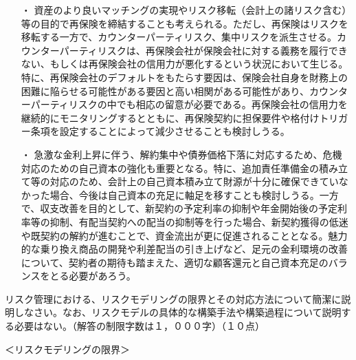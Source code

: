 \documentclass[report,gutter=10mm,fore-edge=10mm,uplatex,dvipdfmx]{jlreq}
\begin{document}
\begin{itemize}
 \item [・]  資産のより良いマッチングの実現やリスク移転（会計上の諸リスク含む）等の目的で再保険を締結することも考えられる。ただし、再保険はリスクを移転する一方で、カウンターパーティリスク、集中リスクを派生させる。カウンターパーティリスクは、再保険会社が保険会社に対する義務を履行できない、もしくは再保険会社の信用力が悪化するという状況において生じる。特に、再保険会社のデフォルトをもたらす要因は、保険会社自身を財務上の困難に陥らせる可能性がある要因と高い相関がある可能性があり、カウンターパーティリスクの中でも相応の留意が必要である。再保険会社の信用力を継続的にモニタリングするとともに、再保険契約に担保要件や格付けトリガー条項を設定することによって減少させることも検討しうる。
 \item [・]  急激な金利上昇に伴う、解約集中や債券価格下落に対応するため、危機対応のための自己資本の強化も重要となる。特に、追加責任準備金の積み立て等の対応のため、会計上の自己資本積み立て財源が十分に確保できていなかった場合、今後は自己資本の充足に軸足を移すことも検討しうる。一方で、収支改善を目的として、新契約の予定利率の抑制や年金開始後の予定利率等の抑制、有配当契約への配当の抑制等を行った場合、新契約獲得の低迷や既契約の解約が進むことで、資金流出が更に促進されることとなる。魅力的な乗り換え商品の開発や利差配当の引き上げなど、足元の金利環境の改善について、契約者の期待も踏まえた、適切な顧客還元と自己資本充足のバランスをとる必要があろう。
\end{itemize}

リスク管理における、リスクモデリングの限界とその対応方法について簡潔に説明しなさい。なお、リスクモデルの具体的な構築手法や構築過程について説明する必要はない。（解答の制限字数は１，０００字）（１０点）

\answer{}
＜リスクモデリングの限界＞
\end{document}
